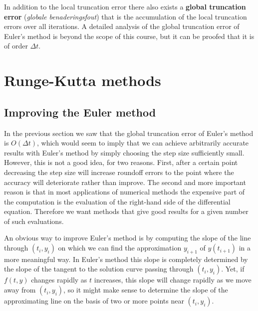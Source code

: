 In addition to the local truncation error there also exists a \textbf{global truncation error} (\textit{globale benaderingsfout}) that is the accumulation of the local truncation errors over all iterations. A detailed analysis of the global truncation error of Euler's method is beyond the scope of this course, but it can be proofed that it is of order $\Delta t$.

\section{Runge-Kutta methods}\label{secRK4}
\subsection{Improving the Euler method}\label{secMidpoint}

In the previous section we saw that the global truncation error of Euler's method is $O(\Delta t)$, which would seem to imply that we can
achieve arbitrarily accurate results with Euler's method by simply choosing the step size sufficiently small. However, this
is not  a good idea, for two reasons. First, after a certain point decreasing the step size will increase roundoff errors to the point where the accuracy will deteriorate rather than improve.  The second and more important reason is that in most applications of numerical
methods the expensive part of the computation is the evaluation of the right-hand side of the differential equation. Therefore we want methods that give good results for a given number of such evaluations. 

An obvious way to improve Euler's method is by computing the slope of the line through $(t_i,y_i)$ on which we can find the approximation $y_{i+1}$ of $y(t_{i+1})$ in a more meaningful way. In Euler's method this slope is completely determined by the slope of the tangent to the solution curve passing through $(t_i,y_i)$. Yet, if $f(t,y)$ changes rapidly as $t$ increases, this slope will change rapidly as we move away from $(t_i,y_i)$, so it might make sense to determine the slope of the approximating line on the basis of two or more points near $(t_i,y_i)$. 

